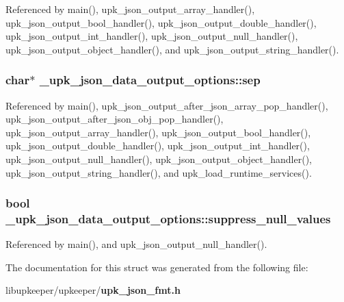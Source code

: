 Referenced by main(), upk\_\-json\_\-output\_\-array\_\-handler(), upk\_\-json\_\-output\_\-bool\_\-handler(), upk\_\-json\_\-output\_\-double\_\-handler(), upk\_\-json\_\-output\_\-int\_\-handler(), upk\_\-json\_\-output\_\-null\_\-handler(), upk\_\-json\_\-output\_\-object\_\-handler(), and upk\_\-json\_\-output\_\-string\_\-handler().

\subsubsection[{sep}]{\setlength{\rightskip}{0pt plus 5cm}char$\ast$ {\bf \_\-upk\_\-json\_\-data\_\-output\_\-options::sep}}\label{struct__upk__json__data__output__options_a994a50c918e5f8b65f3ec77816a199ae}


Referenced by main(), upk\_\-json\_\-output\_\-after\_\-json\_\-array\_\-pop\_\-handler(), upk\_\-json\_\-output\_\-after\_\-json\_\-obj\_\-pop\_\-handler(), upk\_\-json\_\-output\_\-array\_\-handler(), upk\_\-json\_\-output\_\-bool\_\-handler(), upk\_\-json\_\-output\_\-double\_\-handler(), upk\_\-json\_\-output\_\-int\_\-handler(), upk\_\-json\_\-output\_\-null\_\-handler(), upk\_\-json\_\-output\_\-object\_\-handler(), upk\_\-json\_\-output\_\-string\_\-handler(), and upk\_\-load\_\-runtime\_\-services().

\subsubsection[{suppress\_\-null\_\-values}]{\setlength{\rightskip}{0pt plus 5cm}bool {\bf \_\-upk\_\-json\_\-data\_\-output\_\-options::suppress\_\-null\_\-values}}\label{struct__upk__json__data__output__options_a1b9731dcbdf8b672fff36e22fb01ec93}


Referenced by main(), and upk\_\-json\_\-output\_\-null\_\-handler().



The documentation for this struct was generated from the following file:\begin{DoxyCompactItemize}
\item 
libupkeeper/upkeeper/{\bf upk\_\-json\_\-fmt.h}\end{DoxyCompactItemize}
